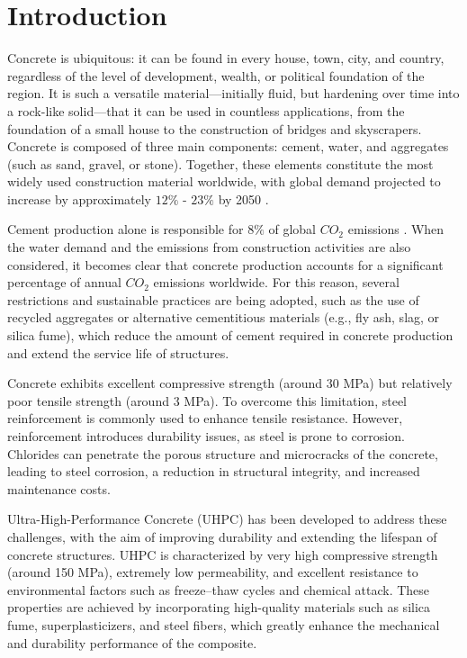 \chapter{Introduction}
\label{intro} %

Concrete is ubiquitous: it can be found in every house, town, city, and country, regardless of the level of development, wealth, or political foundation of the region. It is such a versatile material—initially fluid, but hardening over time into a rock-like solid—that it can be used in countless applications, from the foundation of a small house to the construction of bridges and skyscrapers. Concrete is composed of three main components: cement, water, and aggregates (such as sand, gravel, or stone). Together, these elements constitute the most widely used construction material worldwide, with global demand projected to increase by approximately $12\%$ - $23\%$ by 2050 \cite{cheng2023projecting}.

Cement production alone is responsible for $8\%$ of global $CO_2$ emissions \cite{winnefeld2022}. When the water demand and the emissions from construction activities are also considered, it becomes clear that concrete production accounts for a significant percentage of annual $CO_2$ emissions worldwide. For this reason, several restrictions and sustainable practices are being adopted, such as the use of recycled aggregates or alternative cementitious materials (e.g., fly ash, slag, or silica fume), which reduce the amount of cement required in concrete production and extend the service life of structures.

Concrete exhibits excellent compressive strength (around 30 MPa) but relatively poor tensile strength (around 3 MPa). To overcome this limitation, steel reinforcement is commonly used to enhance tensile resistance. However, reinforcement introduces durability issues, as steel is prone to corrosion. Chlorides can penetrate the porous structure and microcracks of the concrete, leading to steel corrosion, a reduction in structural integrity, and increased maintenance costs.

Ultra-High-Performance Concrete (UHPC) has been developed to address these challenges, with the aim of improving durability and extending the lifespan of concrete structures. UHPC is characterized by very high compressive strength (around 150 MPa), extremely low permeability, and excellent resistance to environmental factors such as freeze–thaw cycles and chemical attack. These properties are achieved by incorporating high-quality materials such as silica fume, superplasticizers, and steel fibers, which greatly enhance the mechanical and durability performance of the composite.

